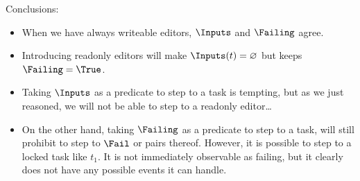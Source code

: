 Conclusions:
\begin{itemize}
  \item
    When we have always writeable editors, $\Inputs$ and $\Failing$ agree.
  \item
    Introducing readonly editors will make $\Inputs(t) = \nothing$ but keeps $\Failing = \True$.
  \item
    Taking $\Inputs$ as a predicate to step to a task is tempting,
    but as we just reasoned,
    we will not be able to step to a readonly editor\ldots
  \item
    On the other hand,
    taking $\Failing$ as a predicate to step to a task,
    will still prohibit to step to $\Fail$ or pairs thereof.
    However, it is possible to step to a locked task like $t_1$.
    It is not immediately observable as failing,
    but it clearly does not have any possible events it can handle.
\end{itemize}
